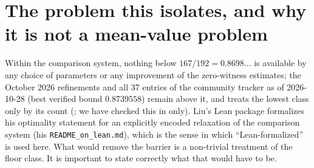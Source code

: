 \documentclass[11pt]{article}
\begin{document}
\section{The problem this isolates, and why it is not a mean-value problem}

Within the comparison system, nothing below $167/192=0.8698\ldots$ is available by any choice of parameters or any improvement of the zero-witness estimates; the October 2026 refinements \cite{Liu26,XS26a,Liu26b} and all 37 entries of the community tracker \cite{Tracker} as of 2026-10-28 (best verified bound $0.8739558$) remain above it, and \cite{Liu26} treats the lowest class only by its count (\cite[Lemma~19.2(4)]{Liu26}; we have checked this in \cite{Liu26} only). Liu's Lean package formalizes his optimality statement for an explicitly encoded relaxation of the comparison system (his \texttt{README\_on\_lean.md}), which is the sense in which ``Lean-formalized'' is used here. What would remove the barrier is a non-trivial treatment of the floor class. It is important to state correctly what that would have to be.
\end{document}
